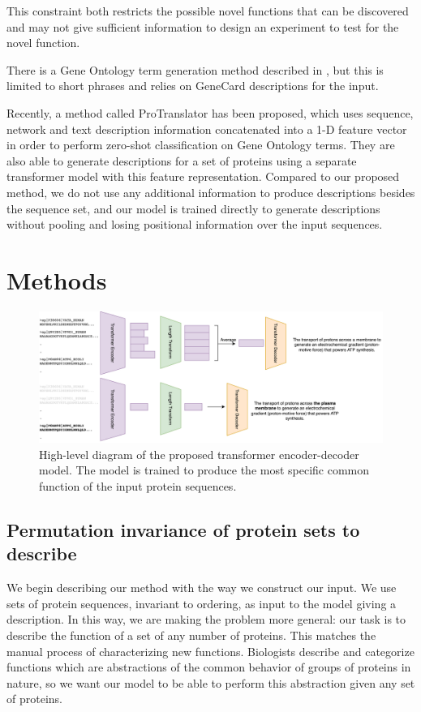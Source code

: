 \documentclass{article}
\begin{document}
This constraint both restricts the possible novel functions that can be discovered and may not give sufficient information to design an experiment to test for the novel function.

There is a Gene Ontology term generation method described in \citet{zhang2020automatic}, but this is limited to short phrases and relies on GeneCard descriptions for the input.

Recently, a method called ProTranslator \citet{ProTranslator} has been proposed, which uses sequence, network and text description information concatenated into a 1-D feature vector in order to perform zero-shot classification on Gene Ontology terms.
They are also able to generate descriptions for a set of proteins using a separate transformer model with this feature representation.
Compared to our proposed method, we do not use any additional information to produce descriptions besides the sequence set, and our model is trained directly to generate descriptions without pooling and losing positional information over the input sequences.


\section{Methods}
\begin{figure}
    \centering
    \includegraphics[width=0.9\linewidth]{prot2go.png}
    \caption{High-level diagram of the proposed transformer encoder-decoder model.
The model is trained to produce the most specific common function of the input protein sequences.}
    \label{overview}
\end{figure}
    \subsection{Permutation invariance of protein sets to describe}
    We begin describing our method with the way we construct our input. We use sets of protein sequences, invariant to ordering, as input to the model giving a description. In this way, we are making the problem more general: our task is to describe the function of a set of any number of proteins. This matches the manual process of characterizing new functions. Biologists describe and categorize functions which are abstractions of the common behavior of groups of proteins in nature, so we want our model to be able to perform this abstraction given any set of proteins.
\end{document}
